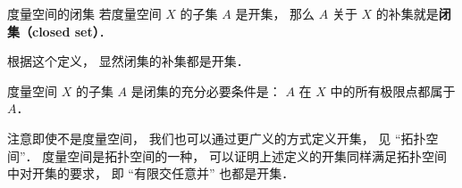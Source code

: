 \begin{definition}{度量空间的闭集}
若度量空间 $X$ 的子集 $A$ 是开集， 那么 $A$ 关于 $X$ 的补集就是\textbf{闭集（closed set）}．
\end{definition}
根据这个定义， 显然闭集的补集都是开集．

\begin{theorem}{}
度量空间 $X$ 的子集 $A$ 是闭集的充分必要条件是： $A$ 在 $X$ 中的所有极限点都属于 $A$．
\end{theorem}

注意即使不是度量空间， 我们也可以通过更广义的方式定义开集， 见 “拓扑空间”． 度量空间是拓扑空间的一种， 可以证明上述定义的开集同样满足拓扑空间中对开集的要求， 即 “有限交任意并” 也都是开集．
